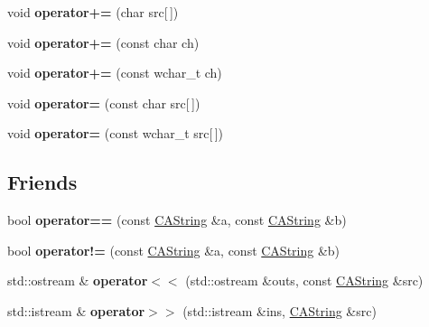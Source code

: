 \begin{DoxyCompactItemize}
\item 
\hypertarget{classps_1_1CAString_a57d6e4aee8a0a8c6928349cff9072717}{}void {\bfseries operator+=} (char src\mbox{[}$\,$\mbox{]})\label{classps_1_1CAString_a57d6e4aee8a0a8c6928349cff9072717}

\item 
\hypertarget{classps_1_1CAString_af4f7429e3184488a516833945d92bcf1}{}void {\bfseries operator+=} (const char ch)\label{classps_1_1CAString_af4f7429e3184488a516833945d92bcf1}

\item 
\hypertarget{classps_1_1CAString_a3c02f1ffb17b84323528e5a8a5b118e0}{}void {\bfseries operator+=} (const wchar\+\_\+t ch)\label{classps_1_1CAString_a3c02f1ffb17b84323528e5a8a5b118e0}

\item 
\hypertarget{classps_1_1CAString_a5a5b7bdd28e83ad0857a3b30a5abfd96}{}void {\bfseries operator=} (const char src\mbox{[}$\,$\mbox{]})\label{classps_1_1CAString_a5a5b7bdd28e83ad0857a3b30a5abfd96}

\item 
\hypertarget{classps_1_1CAString_ab7675867c77ef2dab816b70d372f2055}{}void {\bfseries operator=} (const wchar\+\_\+t src\mbox{[}$\,$\mbox{]})\label{classps_1_1CAString_ab7675867c77ef2dab816b70d372f2055}

\end{DoxyCompactItemize}
\subsection*{Friends}
\begin{DoxyCompactItemize}
\item 
\hypertarget{classps_1_1CAString_af08d599a65a50bd5131168bc28ae3d79}{}bool {\bfseries operator==} (const \hyperlink{classps_1_1CAString}{C\+A\+String} \&a, const \hyperlink{classps_1_1CAString}{C\+A\+String} \&b)\label{classps_1_1CAString_af08d599a65a50bd5131168bc28ae3d79}

\item 
\hypertarget{classps_1_1CAString_aecfb2f974e22bd9e714731540f485fb1}{}bool {\bfseries operator!=} (const \hyperlink{classps_1_1CAString}{C\+A\+String} \&a, const \hyperlink{classps_1_1CAString}{C\+A\+String} \&b)\label{classps_1_1CAString_aecfb2f974e22bd9e714731540f485fb1}

\item 
\hypertarget{classps_1_1CAString_a62956ad2e84aaeb16a98f858b0f47c04}{}std\+::ostream \& {\bfseries operator$<$$<$} (std\+::ostream \&outs, const \hyperlink{classps_1_1CAString}{C\+A\+String} \&src)\label{classps_1_1CAString_a62956ad2e84aaeb16a98f858b0f47c04}

\item 
\hypertarget{classps_1_1CAString_ac6302a1ff70b302727ac650d67e53c96}{}std\+::istream \& {\bfseries operator$>$$>$} (std\+::istream \&ins, \hyperlink{classps_1_1CAString}{C\+A\+String} \&src)\label{classps_1_1CAString_ac6302a1ff70b302727ac650d67e53c96}

\end{DoxyCompactItemize}
